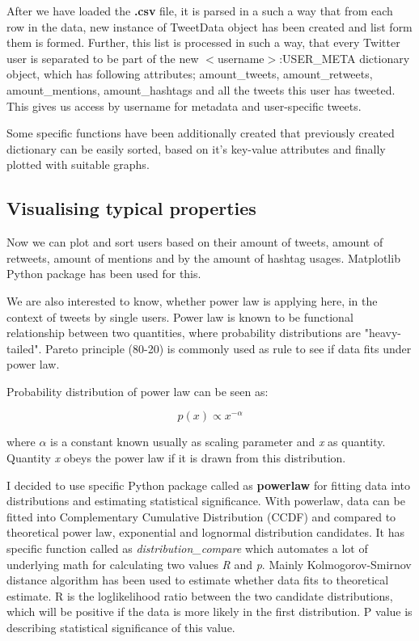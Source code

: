 After we have loaded the \textbf{.csv} file, it is parsed in a such a way that from each row in the data, new instance
of TweetData object has been created and list form them is formed.
Further, this list is processed in such a way, that every Twitter user is separated to be part of the new
$<$username$>$:USER\_META dictionary object, which has following attributes; amount\_tweets, amount\_retweets, amount\_mentions, amount\_hashtags and all the tweets this user has tweeted.
This gives us access by username for metadata and user-specific tweets.

Some specific functions have been additionally created that previously created dictionary can be easily sorted, based on it's key-value attributes and finally plotted with suitable graphs.

\subsection{Visualising typical properties}

Now we can plot and sort users based on their amount of tweets, amount of retweets, amount of mentions and by the amount of hashtag usages.
Matplotlib Python package has been used for this.

We are also interested to know, whether power law is applying here, in the context of tweets by single users.
Power law is known to be functional relationship between two quantities, where probability distributions are  "heavy-tailed".
Pareto principle (80-20) is commonly used as rule to see if data fits under power law\cite{enwiki:1023956740}.

Probability distribution of power law can be seen as:

\begin{equation}
    p(x) \propto x^{-\alpha}\label{eq:equation1}
\end{equation}

where $\alpha$ is a constant known usually as scaling parameter and \textit{x} as quantity.
Quantity \textit{x} obeys the power law if it is drawn from this distribution.\cite{doi:10.1137/070710111}

I decided to use specific Python package called as \textbf{powerlaw}\cite{Alstott_2014} for fitting data into distributions and estimating statistical significance.
With powerlaw, data can be fitted into Complementary Cumulative Distribution (CCDF) and compared to theoretical power law, exponential and lognormal distribution candidates.
It has specific function called as \textit{distribution\_compare} which automates a lot of underlying math for calculating two values \textit{R} and \textit{p}.
Mainly Kolmogorov-Smirnov distance algorithm has been used to estimate whether data fits to theoretical estimate.
R is the loglikelihood ratio between the two candidate distributions, which will be positive if the data is more likely in the first distribution.
P value is describing statistical significance of this value.

